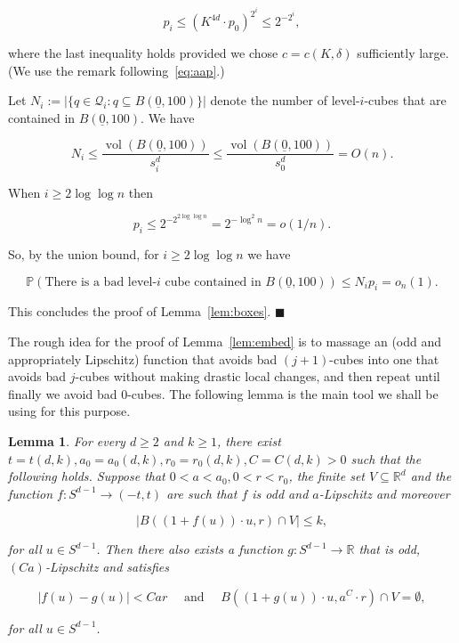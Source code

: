 \documentclass[11pt]{article}%
\newenvironment{proof}{\vspace{1ex}\noindent{\bf Proof.}}{\hspace*{\fill}$\blacksquare$\vspace{1ex}}
\newtheorem{lemma}[lemma]{Lemma}
\newcommand{\Qcal}[0]{\ensuremath{{\mathcal Q}}}
\newcommand{\eR}[0]{\ensuremath{ \mathbb R}}
\newcommand{\Pee}[0]{\ensuremath{{\mathbb P}}}
\newcommand{\orig}{\underline{0}}
\DeclareMathOperator{\vol}{vol}
\begin{document}
\begin{proof}
$$ p_i \leq \left( K^{4 d} \cdot p_0 \right)^{2^i} 
\leq 2^{-2^i}, $$

\noindent 
where the last inequality holds provided we chose $c = c(K,\delta)$ sufficiently large.
(We use the remark following~\eqref{eq:aap}.) 

Let $N_i := |\{ q \in \Qcal_i : q \subseteq B(\orig,100)\}|$ denote the number of level-$i$-cubes that 
are contained in $B(\orig,100)$.
We have 

$$ N_i \leq \frac{\vol( B(\orig,100) )}{s_i^d} \leq \frac{\vol( B(\orig,100) )}{s_0^d} = O(n). $$

\noindent
When $i \geq 2\log\log n$ then 

$$p_i \leq 2^{-2^{2\log\log n}} = 2^{-\log^2 n} = o(1/n). $$

\noindent 
So, by the union bound, for $i \geq 2\log\log n$ we have 

$$ \Pee\left(\text{There is a bad level-$i$ cube contained in $B(\orig,100)$}\right) 
\leq N_i p_i = o_n(1). $$

\noindent 
This concludes the proof of Lemma~\ref{lem:boxes}.
\end{proof}


The rough idea for the proof of Lemma~\ref{lem:embed} is to 
massage an (odd and appropriately Lipschitz) function that avoids bad $(j+1)$-cubes
into one that avoids bad $j$-cubes without making drastic local changes, and then 
repeat until finally we avoid bad $0$-cubes.
The following lemma is the main tool we shall be using for this purpose.


\begin{lemma}\label{lem:fg}
For every $d\geq 2$ and $k\geq 1$, there exist $t=t(d,k), a_0=a_0(d,k), r_0=r_0(d,k), C=C(d,k) > 0$ such 
that the following holds.
Suppose that $0 < a < a_0, 0 < r < r_0$, the finite set $V \subseteq \eR^d$
and the function $f :S^{d-1} \to (-t,t)$ are such that  
$f$ is odd and $a$-Lipschitz and moreover

$$ \left|B\left( (1+f(u))\cdot u, r \right) \cap V\right| \leq k, $$

\noindent
for all $u \in S^{d-1}$.
Then there also exists a function $g : S^{d-1} \to \eR$ that is odd, $(Ca)$-Lipschitz and satisfies 

$$ |f(u)-g(u)| < Car \quad \text{ and } \quad 
B\left( (1+g(u)) \cdot u, a^{C}\cdot r  \right) \cap V = \emptyset, $$

\noindent 
for all $u \in S^{d-1}$.
\end{lemma}
\end{document}
